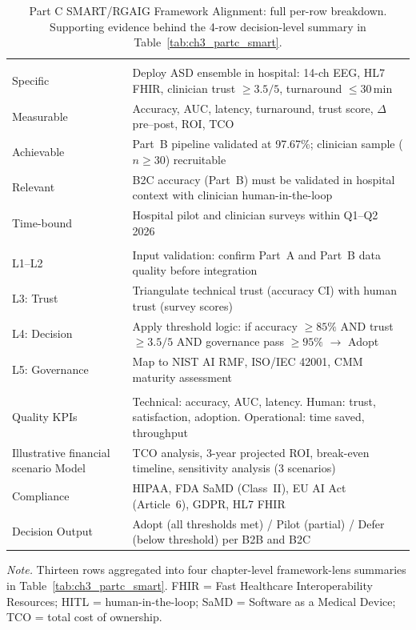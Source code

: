 {
\begin{xltabular}{\textwidth}{@{} >{\raggedright\arraybackslash}p{2.0cm} L @{}}
\caption[Part C SMART/RGAIG Alignment: Full Per-Row Breakdown]{Part C SMART/RGAIG Framework Alignment: full per-row breakdown. Supporting evidence behind the 4-row decision-level summary in Table~\ref{tab:ch3_partc_smart}.}\label{tab:appc_partc_smart_full} \\
\toprule
{} &  \\
\midrule
\endfirsthead
\endhead
\bottomrule
\endlastfoot
{} \\
\addlinespace
Specific & Deploy ASD ensemble in hospital: 14-ch EEG, HL7 FHIR, clinician trust $\geq 3.5/5$, turnaround $\leq 30$\,min \\
Measurable & Accuracy, AUC, latency, turnaround, trust score, $\Delta$ pre--post, ROI, TCO \\
Achievable & Part~B pipeline validated at 97.67\%; clinician sample ($n \geq 30$) recruitable \\
Relevant & B2C accuracy (Part~B) must be validated in hospital context with clinician human-in-the-loop \\
Time-bound & Hospital pilot and clinician surveys within Q1--Q2 2026 \\
\midrule
{} \\
\addlinespace
L1--L2 & Input validation: confirm Part~A and Part~B data quality before integration \\
L3: Trust & Triangulate technical trust (accuracy CI) with human trust (survey scores) \\
L4: Decision & Apply threshold logic: if accuracy $\geq 85\%$ AND trust $\geq 3.5/5$ AND governance pass $\geq 95\%$ $\to$ Adopt \\
L5: Governance & Map to NIST AI RMF, ISO/IEC 42001, CMM maturity assessment \\
\midrule
{} \\
\addlinespace
Quality KPIs & Technical: accuracy, AUC, latency. Human: trust, satisfaction, adoption. Operational: time saved, throughput \\
Illustrative financial scenario Model & TCO analysis, 3-year projected ROI, break-even timeline, sensitivity analysis (3 scenarios) \\
Compliance & HIPAA, FDA SaMD (Class~II), EU AI Act (Article~6), GDPR, HL7 FHIR \\
Decision Output & Adopt (all thresholds met) / Pilot (partial) / Defer (below threshold) per B2B and B2C \\
\end{xltabular}}
\vspace{0.4em}
\noindent\textit{Note.} Thirteen rows aggregated into four chapter-level framework-lens summaries in Table~\ref{tab:ch3_partc_smart}. FHIR = Fast Healthcare Interoperability Resources; HITL = human-in-the-loop; SaMD = Software as a Medical Device; TCO = total cost of ownership.

